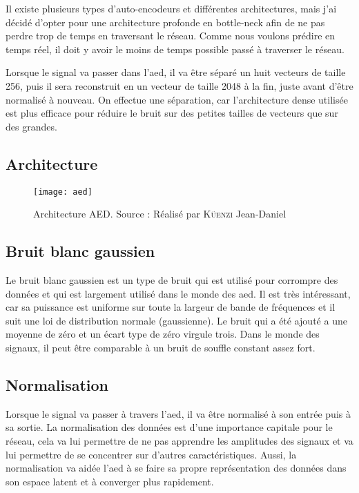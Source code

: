 Il existe plusieurs types d'auto-encodeurs et différentes architectures, mais j'ai décidé d'opter pour une architecture profonde en bottle-neck afin de ne pas perdre trop de temps en traversant le réseau. Comme nous voulons prédire en temps réel, il doit y avoir le moins de temps possible passé à traverser le réseau.

Lorsque le signal va passer dans l'\gls{aed}, il va être séparé un huit vecteurs de taille 256, puis il sera reconstruit en un vecteur de taille 2048 à la fin, juste avant d'être normalisé à nouveau. On effectue une séparation, car l'architecture dense utilisée est plus efficace pour réduire le bruit sur des petites tailles de vecteurs que sur des grandes.

\subsection{Architecture}

\begin{figure}[H]
	\centering
	\texttt{[image: aed]}
	\caption[Architecture AED]{Architecture AED. Source : Réalisé par \textsc{Küenzi} Jean-Daniel}
	\label{fig:aed}
\end{figure}

\subsection{Bruit blanc gaussien}

Le bruit blanc gaussien est un type de bruit qui est utilisé pour corrompre des données et qui est largement utilisé dans le monde des \gls{aed}. Il est très intéressant, car sa puissance est uniforme sur toute la largeur de bande de fréquences et il suit une loi de distribution normale (gaussienne). Le bruit qui a été ajouté a une moyenne de zéro et un écart type de zéro virgule trois. Dans le monde des signaux, il peut être comparable à un bruit de souffle constant assez fort.

\subsection{Normalisation}

Lorsque le signal va passer à travers l'\gls{aed}, il va être normalisé à son entrée puis à sa sortie. La normalisation des données est d'une importance capitale pour le réseau, cela va lui permettre de ne pas apprendre les amplitudes des signaux et va lui permettre de se concentrer sur d'autres caractéristiques. Aussi, la normalisation va aidée l'\gls{aed} à se faire sa propre représentation des données dans son espace latent et à converger plus rapidement.

